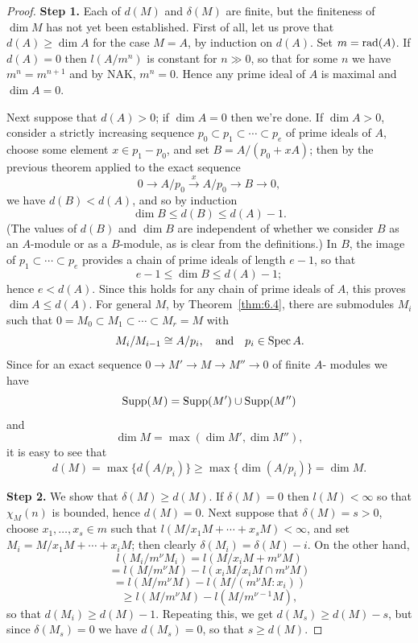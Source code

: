 \begin{proof}
\textbf{Step 1.} Each of $d(M)$ and $\delta(M)$ are finite, but the finiteness of $\dim M$
has not yet been established. First of all, let us prove that $d(A) \ge \dim A$
for the case $M = A$, by induction on $d(A)$. Set $m = \operatorname{rad}(A)$. If $d(A) = 0$ then
$l(A/m^n)$ is constant for $n \gg 0$, so that for some $n$ we have $m^n = m^{n+1}$ and
by NAK, $m^n = 0$. Hence any prime ideal of $A$ is maximal and $\dim A = 0$.

Next suppose that $d(A) > 0$; if $\dim A = 0$ then we're done. If $\dim A > 0$,
consider a strictly increasing sequence $p_0 \subset p_1 \subset \cdots \subset p_e$ of prime ideals
of $A$, choose some element $x \in p_1 - p_0$, and set $B = A/(p_0 + xA)$; then by
the previous theorem applied to the exact sequence
\[
  0 \to A/p_0 \xrightarrow{x} A/p_0 \to B \to 0,
\]
we have $d(B) < d(A)$, and so by induction
\[
  \dim B \le d(B) \le d(A) - 1.
\]
(The values of $d(B)$ and $\dim B$ are independent of whether we consider $B$ as
an $A$-module or as a $B$-module, as is clear from the definitions.) In $B$, the
image of $p_1 \subset \cdots \subset p_e$ provides a chain of prime ideals of length $e - 1$, so that
\[
  e - 1 \le \dim B \le d(A) - 1;
\]
hence $e < d(A)$. Since this holds for any chain of prime ideals of $A$, this
proves $\dim A \le d(A)$. For general $M$, by Theorem~\ref{thm:6.4}, there are submodules
$M_i$ such that $0 = M_0 \subset M_1 \subset \cdots \subset M_r = M$ with
\[
  M_i/M_{i-1} \cong A/p_i, \quad \text{and} \quad p_i \in \operatorname{Spec} A.
\]
Since for an exact sequence $0 \to M' \to M \to M'' \to 0$ of finite $A$-
modules we have
\[
  \operatorname{Supp}(M) = \operatorname{Supp}(M') \cup \operatorname{Supp}(M'')
\]
and
\[
  \dim M = \max(\dim M', \dim M''),
\]
it is easy to see that
\[
  d(M) = \max\{d(A/p_i)\} \ge \max\{\dim(A/p_i)\} = \dim M.
\]

\textbf{Step 2.} We show that $\delta(M) \ge d(M)$. If $\delta(M) = 0$ then $l(M) < \infty$ so that $\chi_M(n)$
is bounded, hence $d(M) = 0$. Next suppose that $\delta(M) = s > 0$, choose
$x_1, \ldots, x_s \in m$ such that $l(M/x_1M + \cdots + x_sM) < \infty$, and set $M_i = M/x_1M +
\cdots + x_iM$; then clearly $\delta(M_i) = \delta(M) - i$. On the other hand,
\[
  l(M_i/m^\nu M_i) = l(M/x_iM + m^\nu M)
\]
\[
  = l(M/m^\nu M) - l(x_iM/x_iM \cap m^\nu M)
\]
\[
  = l(M/m^\nu M) - l(M/(m^\nu M:x_i))
\]
\[
  \ge l(M/m^\nu M) - l(M/m^{\nu-1}M),
\]
so that $d(M_i) \ge d(M) - 1$. Repeating this, we get $d(M_s) \ge d(M) - s$, but since
$\delta(M_s) = 0$ we have $d(M_s) = 0$, so that $s \ge d(M)$.


\end{proof}
